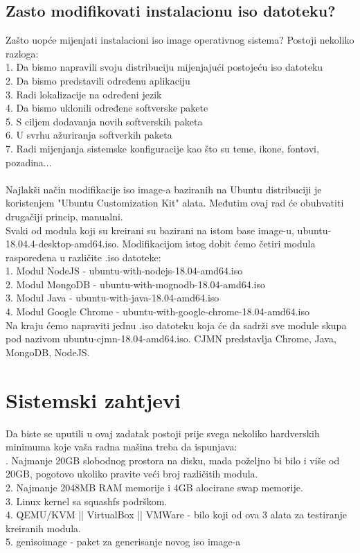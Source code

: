 \documentclass[12pt,vi]{mitthesis}
\begin{document}
\section*{Zasto modifikovati instalacionu iso datoteku?}
Zašto uopće mijenjati instalacioni iso image operativnog sistema? Postoji nekoliko razloga:\\
1. Da bismo napravili svoju distribuciju mijenjajući postojeću iso datoteku\\
2. Da bismo predstavili određenu aplikaciju\\
3. Radi lokalizacije na određeni jezik\\
4. Da bismo uklonili određene softverske pakete\\
5. S ciljem dodavanja novih softverskih paketa\\
6. U svrhu ažuriranja softverkih paketa\\
7. Radi mijenjanja sistemske konfiguracije kao što su teme, ikone, fontovi, pozadina...\\
\\
Najlakši način modifikacije iso image-a baziranih na Ubuntu distribuciji je koristenjem "Ubuntu Customization Kit" alata. Međutim ovaj rad će obuhvatiti drugačiji princip, manualni.\\
Svaki od modula koji su kreirani su bazirani na istom base image-u, ubuntu-18.04.4-desktop-amd64.iso. Modifikacijom istog dobit ćemo četiri modula raspoređena u različite .iso datoteke:\\ 
1. Modul NodeJS - ubuntu-with-nodejs-18.04-amd64.iso\\
2. Modul MongoDB - ubuntu-with-mognodb-18.04-amd64.iso\\
3. Modul Java - ubuntu-with-java-18.04-amd64.iso\\
4. Modul Google Chrome - ubuntu-with-google-chrome-18.04-amd64.iso\\
\indent
Na kraju ćemo napraviti jednu .iso datoteku koja će da sadrži sve module skupa pod nazivom ubuntu-cjmn-18.04-amd64.iso. CJMN predstavlja Chrome, Java, MongoDB, NodeJS.

\chapter*{Sistemski zahtjevi}
Da biste se uputili u ovaj zadatak postoji prije svega nekoliko hardverskih minimuma koje vaša radna mašina treba da ispunjava:\\
. Najmanje 20GB slobodnog prostora na disku, mada poželjno bi bilo i više od 20GB, pogotovo ukoliko pravite veći broj različitih modula.\\
2. Najmanje 2048MB RAM memorije i 4GB alocirane swap memorije.\\
3. Linux kernel sa squashfs podrškom.\\
4. QEMU/KVM || VirtualBox || VMWare - bilo koji od ova 3 alata za testiranje kreiranih modula.\\
5. genisoimage - paket za generisanje novog iso image-a\\
\end{document}
